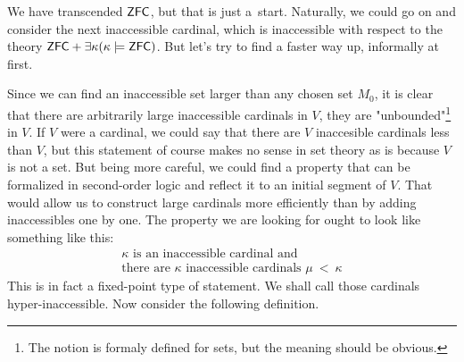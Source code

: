 




We have transcended $\sf{ZFC}$, but that is just a~start. Naturally, we could go on and consider the next inaccessible cardinal, which is inaccessible with respect to the theory $\sf{ZFC} + \exists \kappa (\kappa \models \sf{ZFC})$. But let's try to find a faster way up, informally at first. 

Since we can find an inaccessible set larger than any chosen set $M_0$, it is clear that there are arbitrarily large inaccessible cardinals in $V$, they are "unbounded"\footnote{The notion is formaly defined for sets, but the meaning should be obvious.} in $V$. If $V$ were a cardinal, we could say that there are $V$ inaccesible cardinals less than $V$, but this statement of course makes no sense in set theory as is because $V$ is not a set. But being more careful, we could find a property that can be formalized in second-order logic and reflect it to an initial segment of $V$. That would allow us to construct large cardinals more efficiently than by adding inaccessibles one by one. The property we are looking for ought to look like something like this:
\begin{equation}
\begin{gathered}
\kappa \mbox{ is an inaccessible cardinal and}\\
\mbox{there are }\kappa\mbox{ inaccessible cardinals }\mu\ <\ \kappa
\end{gathered}
\end{equation}
This is in fact a fixed-point type of statement. We shall call those cardinals hyper-inaccessible. Now consider the following definition.

